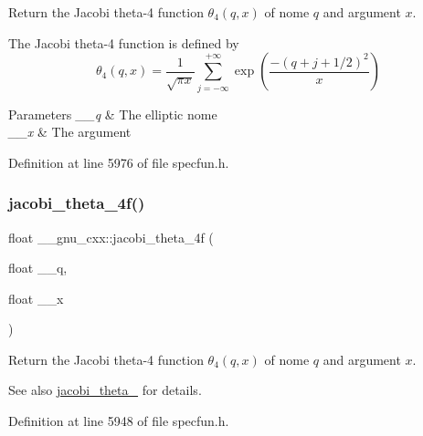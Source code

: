 Return the Jacobi theta-\/4 function $ \theta_4(q,x) $ of nome $ q $ and argument $ x $.

The Jacobi theta-\/4 function is defined by \[ \theta_4(q,x) = \frac{1}{\sqrt{\pi x}} \sum_{j=-\infty}^{+\infty} \exp\left( \frac{-(q + j + 1/2)^2}{x} \right) \]


\begin{DoxyParams}{Parameters}
{\em \+\_\+\+\_\+q} & The elliptic nome \\
\hline
{\em \+\_\+\+\_\+x} & The argument \\
\hline
\end{DoxyParams}


Definition at line 5976 of file specfun.\+h.

\mbox{\label{group__gnu__math__spec__func_ga57dcc5ae4b1a3d1e38adccad85204bca}} 
\subsubsection{\texorpdfstring{jacobi\+\_\+theta\+\_\+4f()}{jacobi\_theta\_4f()}}
{\footnotesize\ttfamily float \+\_\+\+\_\+gnu\+\_\+cxx\+::jacobi\+\_\+theta\+\_\+4f (\begin{DoxyParamCaption}\item[{float}]{\+\_\+\+\_\+q,  }\item[{float}]{\+\_\+\+\_\+x }\end{DoxyParamCaption})\hspace{0.3cm}{\ttfamily [inline]}}

Return the Jacobi theta-\/4 function $ \theta_4(q,x) $ of nome $ q $ and argument $ x $.

\begin{DoxySeeAlso}{See also}
\hyperlink{group__gnu__math__spec__func_ga676501b6284d5702a3dc61252e6c78ab}{jacobi\+\_\+theta\+\_} for details. 
\end{DoxySeeAlso}


Definition at line 5948 of file specfun.\+h.

\mbox{\label{group__gnu__math__spec__func_ga7c2a13198bdfd3f8cf1bc1758b1f56be}} 
